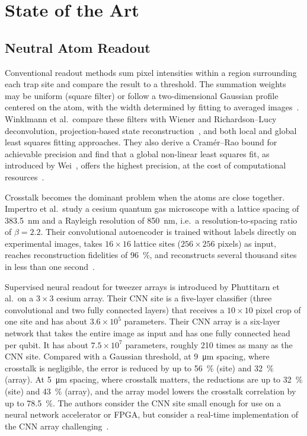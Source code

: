 \section{State of the Art}\label{sec:sota}


\subsection{Neutral Atom Readout}


Conventional readout methods sum pixel intensities within a region surrounding each trap site and compare the result to a threshold. The summation weights may be uniform (square filter) or follow a two-dimensional Gaussian profile centered on the atom, with the width determined by fitting to averaged images~\cite{kent2025}. Winklmann et al.\ compare these filters with Wiener and Richardson--Lucy deconvolution, projection-based state reconstruction~\cite{wei2023}, and both local and global least squares fitting approaches. They also derive a Cramér–Rao bound for achievable precision and find that a global non-linear least squares fit, as introduced by Wei~\cite{wei2023}, offers the highest precision, at the cost of computational resources~\cite{winklmann2024}.


Crosstalk becomes the dominant problem when the atoms are close together. Impertro et al.\ study a cesium quantum gas microscope with a lattice spacing of \SI{383.5}{\nano\metre} and a Rayleigh resolution of \SI{850}{\nano\metre}, i.e.\ a resolution-to-spacing ratio of $\beta = 2.2$. Their convolutional autoencoder is trained without labels directly on experimental images, takes $16\times16$ lattice sites ($256\times256$ pixels) as input, reaches reconstruction fidelities of \SI{96}{\percent}, and reconstructs several thousand sites in less than one second~\cite{impertro2023}.


Supervised neural readout for tweezer arrays is introduced by Phuttitarn et al.\ on a $3\times3$ cesium array. Their CNN site is a five-layer classifier (three convolutional and two fully connected layers) that receives a $10\times10$ pixel crop of one site and has about $3.6\times10^{5}$ parameters. Their CNN array is a six-layer network that takes the entire image as input and has one fully connected head per qubit. It has about $7.5\times10^{7}$ parameters, roughly 210 times as many as the CNN site. Compared with a Gaussian threshold, at \SI{9}{\micro\metre} spacing, where crosstalk is negligible, the error is reduced by up to \SI{56}{\percent} (site) and \SI{32}{\percent} (array). At \SI{5}{\micro\metre} spacing, where crosstalk matters, the reductions are up to \SI{32}{\percent} (site) and \SI{43}{\percent} (array), and the array model lowers the crosstalk correlation by up to \SI{78.5}{\percent}. The authors consider the CNN site small enough for use on a neural network accelerator or FPGA, but consider a real-time implementation of the CNN array challenging~\cite{phuttitarn2023}.


